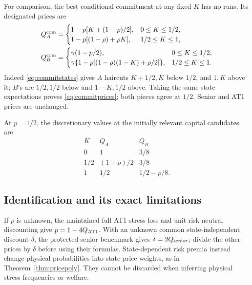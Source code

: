 \documentclass[11pt,a4paper]{article}
\numberwithin{equation}{section}
\theoremstyle{definition}
\begin{document}
For comparison, the best conditional commitment at any fixed \(K\)
has no runs. Its designated prices are
\begin{equation}\label{eq:commitprices}
\begin{aligned}
Q_A^{\rm com}&=
\begin{cases}
1-p[K+(1-\rho)/2],&0\le K\le1/2,\\
1-p[(1-\rho)+\rho K],&1/2\le K\le1,
\end{cases}\\
Q_B^{\rm com}&=
\begin{cases}
\gamma(1-p/2),&0\le K\le1/2,\\
\gamma\{1-p[(1-\rho)(1-K)+\rho/2]\},&1/2\le K\le1 .
\end{cases}
\end{aligned}
\end{equation}
Indeed \eqref{eq:commitstates} gives \(A\) haircuts
\(K+1/2,K\) below \(1/2\), and \(1,K\) above it; \(B\)'s are
\(1/2,1/2\) below and \(1-K,1/2\) above. Taking the same state
expectations proves \eqref{eq:commitprices}; both pieces agree at
\(1/2\). Senior and AT1 prices are unchanged.

At \(p=1/2\), the discretionary values at the initially relevant
capital candidates are
\[
\begin{array}{c|cc}
K&Q_A&Q_B\\ \hline
0&1&3/8\\
1/2&(1+\rho)/2&3/8\\
1&1/2&1/2-\rho/8 .
\end{array}
\]

\subsection{Identification and its exact limitations}
If \(p\) is unknown, the maintained full AT1 stress loss and unit
risk-neutral discounting give \(p=1-4Q_{\rm AT1}\).
With an unknown common state-independent discount \(\delta\), the
protected senior benchmark gives \(\delta=2Q_{\rm senior}\);
divide the other prices by \(\delta\) before using their formulas.
State-dependent risk premia instead change physical probabilities
into state-price weights, as in Theorem~\ref{thm:pricepoly}. They
cannot be discarded when inferring physical stress frequencies or welfare.
\end{document}
